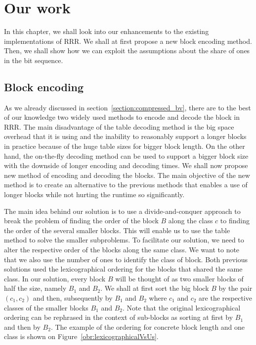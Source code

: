 \chapter{Our work}
\label{kap:kap3}

In this chapter, we shall look into our enhancements to the existing
implementations of RRR. We shall at first propose a new block encoding
method. Then, we shall show how we can exploit the assumptions about the
share of ones in the bit sequence.  

\section{Block encoding}

As we already discussed in section~\ref{section:compressed_bv}, there are to
the best of our knowledge two widely used methods to encode and decode the
block in RRR. The main disadvantage of the table decoding method is the big space
overhead that it is using and the inability to reasonably support a longer blocks
in practice because of the huge table sizes for bigger block length. On the
other hand, the on-the-fly decoding method can be used to support a bigger block size
with the downside of longer encoding and decoding times. We shall now propose
new method of encoding and decoding the blocks. The main objective of the new method is
to create an alternative to the previous methods that enables a use of longer blocks
while not hurting the runtime so significantly.

The main idea behind our solution is to use a divide-and-conquer approach to break
the problem of finding the order of the block $B$ along the class $c$ to finding the order
of the several smaller blocks. This will enable us to use the table method to solve the
smaller subproblems. To facilitate our solution, we need to alter the respective order of
the blocks along the same class. We want to note that we also use the number of ones to
identify the class of block. Both previous solutions used the lexicographical ordering
for the blocks that shared the same class. In our solution, every block $B$ will be thought
of as two smaller blocks of half the size, namely $B_1$ and $B_2$. We shall at first sort the
big block $B$ by the pair $(c_1, c_2)$ and then, subsequently by $B_1$ and $B_2$ where $c_1$
and $c_2$ are the respective classes of the smaller blocks $B_1$ and $B_2$. Note that the
original lexicographical ordering can be rephrased in the context of sub-blocks as sorting
at first by $B_1$ and then by $B_2$. The example of the ordering for concrete block length
and one class is shown on Figure~\ref{obr:lexicographicalVsUs}.

